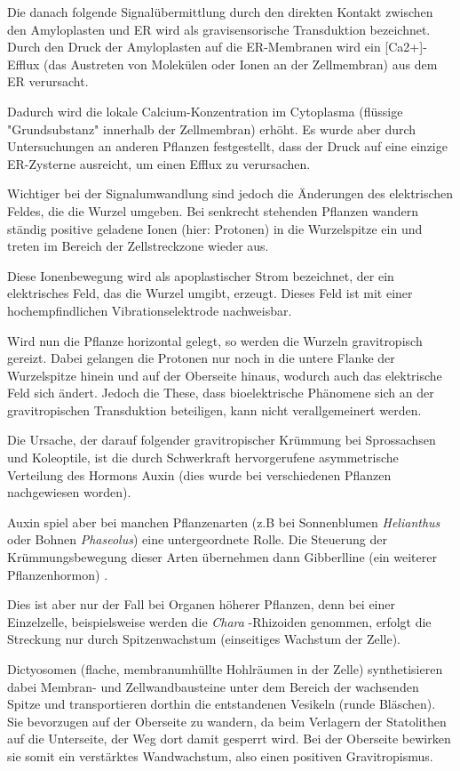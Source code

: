 \documentclass[
a4paper, 
11pt, 
ngerman,
listof=totoc,
bibliography=totocnumbered,
abstracton
]{scrreprt}
\begin{document}
Die danach folgende Signalübermittlung durch den direkten Kontakt zwischen den Amyloplasten und ER wird als gravisensorische Transduktion bezeichnet.
Durch den Druck der Amyloplasten auf die ER-Membranen wird ein [Ca2+]-Efflux (das Austreten von Molekülen oder Ionen an der Zellmembran) aus dem ER verursacht.

Dadurch wird die lokale Calcium-Konzentration im Cytoplasma (flüssige "Grundsubstanz" innerhalb der Zellmembran) erhöht. 
Es wurde aber durch Untersuchungen an anderen Pflanzen festgestellt, dass der Druck auf eine einzige ER-Zysterne ausreicht, um einen Efflux zu verursachen.

Wichtiger bei der Signalumwandlung sind jedoch die Änderungen des elektrischen Feldes, die die Wurzel umgeben.
Bei senkrecht stehenden Pflanzen wandern ständig positive geladene Ionen (hier: Protonen) in die Wurzelspitze ein und treten im Bereich der Zellstreckzone wieder aus.

Diese Ionenbewegung wird als apoplastischer Strom bezeichnet, der ein elektrisches Feld, das die Wurzel umgibt, erzeugt. Dieses Feld ist mit einer hochempfindlichen Vibrationselektrode nachweisbar. 

Wird nun die Pflanze horizontal gelegt, so werden die Wurzeln gravitropisch gereizt. Dabei gelangen die Protonen nur noch in die untere Flanke der Wurzelspitze hinein und auf der Oberseite hinaus, wodurch auch das elektrische Feld sich ändert.
Jedoch die These, dass bioelektrische Phänomene sich an der gravitropischen Transduktion beteiligen, kann nicht verallgemeinert werden.

Die Ursache, der darauf folgender gravitropischer Krümmung bei Sprossachsen und Koleoptile, ist die durch Schwerkraft hervorgerufene asymmetrische Verteilung des Hormons Auxin (dies wurde bei verschiedenen Pflanzen nachgewiesen worden).

Auxin spiel aber bei manchen Pflanzenarten (z.B bei Sonnenblumen \emph{Helianthus}  oder Bohnen \emph{Phaseolus}) eine untergeordnete Rolle.
Die Steuerung der Krümmungsbewegung dieser Arten übernehmen dann Gibberlline (ein weiterer Pflanzenhormon) \parencite[502f]{Nultsch}.
  
Dies ist aber nur der Fall bei Organen höherer Pflanzen, denn bei einer Einzelzelle, beispielsweise werden die \emph{Chara} -Rhizoiden genommen, erfolgt die Streckung nur durch Spitzenwachstum (einseitiges Wachstum der Zelle).

Dictyosomen (flache, membranumhüllte Hohlräumen in der Zelle) synthetisieren dabei Membran- und Zellwandbausteine unter dem Bereich der wachsenden Spitze und transportieren dorthin die entstandenen Vesikeln (runde Bläschen).
Sie bevorzugen auf der Oberseite zu wandern, da beim Verlagern der Statolithen auf die Unterseite, der Weg dort damit gesperrt wird. Bei der Oberseite bewirken sie somit ein verstärktes Wandwachstum, also einen positiven Gravitropismus.
\end{document}
